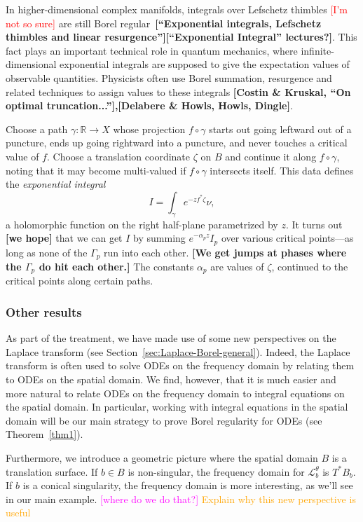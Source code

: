 \documentclass{article}
\theoremstyle{definition}
\newcommand{\maps}{\colon}
\newcommand{\R}{\mathbb{R}}
\newcommand{\laplace}{\mathcal{L}}
\begin{document}
In higher-dimensional complex manifolds, integrals over Lefschetz thimbles \textcolor{red}{[I'm not so sure]} are still Borel regular~\textbf{[``Exponential integrals, Lefschetz thimbles and linear resurgence''][``Exponential Integral'' lectures?]}. This fact plays an important technical role in quantum mechanics, where infinite-dimensional exponential integrals are supposed to give the expectation values of observable quantities. Physicists often use Borel summation, resurgence and related techniques to assign values to these integrals \textbf{[Costin \& Kruskal, ``On optimal truncation...''],[Delabere \& Howls, Howls, Dingle]}.

\color{DarkTurquoise}
Choose a path $\gamma \maps \R \to X$ whose projection $f \circ \gamma$ starts out going leftward out of a puncture, ends up going rightward into a puncture, and never touches a critical value of $f$. Choose a translation coordinate $\zeta$ on $B$ and continue it along $f \circ \gamma$, noting that it may become multi-valued if $f \circ \gamma$ intersects itself. This data defines the {\em exponential integral}
\[ I = \int_\gamma e^{-z f^*\zeta} \nu, \]
a holomorphic function on the right half-plane parametrized by $z$. It turns out \textbf{[we hope]} that we can get $I$ by summing $e^{-\alpha_p z} I_p$ over various critical points---as long as none of the $\Gamma_p$ run into each other. \textbf{[We get jumps at phases where the $\Gamma_p$ do hit each other.]} The constants $\alpha_p$ are values of $\zeta$, continued to the critical points along certain paths.

\color{black}

\subsubsection{Other results}

As part of the treatment, we have made use of some new perspectives on the Laplace transform (see Section~\ref{sec:Laplace-Borel-general}). Indeed, the Laplace transform is often used to solve ODEs on the frequency domain by relating them to ODEs on the spatial domain. We find, however, that it is much easier and more natural to relate ODEs on the frequency domain to integral equations on the spatial domain. In particular, working with integral equations in the spatial domain will be our main strategy to prove Borel regularity for ODEs (see Theorem~\ref{thm1}). 

Furthermore, we introduce a geometric picture where the spatial domain $B$ is a translation surface. If $b \in B$ is non-singular, the frequency domain for $\laplace_b^\theta$ is $T^* B_b$. If $b$ is a conical singularity, the frequency domain is more interesting, as we'll see in our main example. \textcolor{magenta}{[where do we do that?]} \textcolor{orange}{Explain why this new perspective is useful} 
\end{document}
